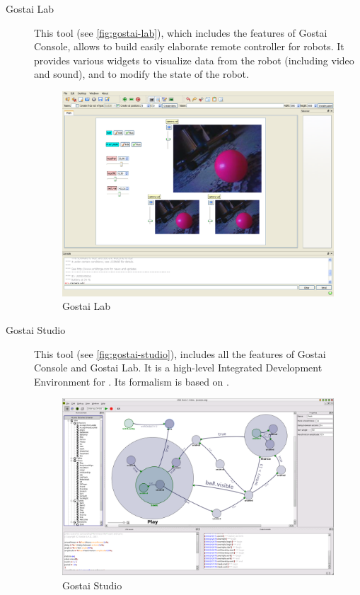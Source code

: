 \begin{description}
\item[Gostai Lab] This tool (see \autoref{fig:gostai-lab}), which
  includes the features of Gostai Console, allows to build easily
  elaborate remote controller for robots.  It provides various widgets
  to visualize data from the robot (including video and sound), and to
  modify the state of the robot.

  \begin{figure}[htp]
    \centering
    \includegraphics[width=.8\linewidth]{img/gostai-lab}
    \caption{Gostai Lab}
    \label{fig:gostai-lab}
  \end{figure}

\item[Gostai Studio] This tool (see \autoref{fig:gostai-studio}),
  includes all the features of Gostai Console and Gostai Lab.  It is a
  high-level Integrated Development Environment for \urbi.  Its
  formalism is based on .

  \begin{figure}[htp]
    \centering
    \includegraphics[width=.8\linewidth]{img/gostai-studio}
    \caption{Gostai Studio}
    \label{fig:gostai-studio}
  \end{figure}


\end{description}
